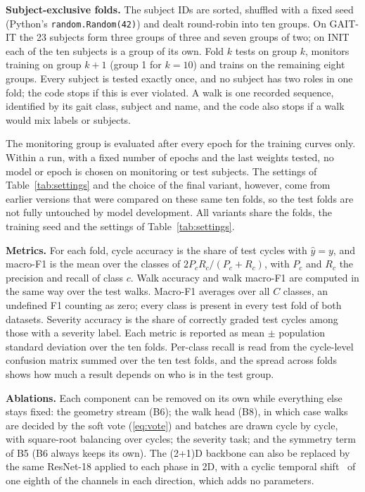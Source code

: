 \documentclass[conference]{IEEEtran}
\begin{document}
\textbf{Subject-exclusive folds.} The subject IDs are sorted, shuffled with a fixed seed (Python's \texttt{random.Random(42)}) and dealt round-robin into ten groups. On GAIT-IT the 23 subjects form three groups of three and seven groups of two; on INIT each of the ten subjects is a group of its own. Fold $k$ tests on group $k$, monitors training on group $k+1$ (group 1 for $k=10$) and trains on the remaining eight groups. Every subject is tested exactly once, and no subject has two roles in one fold; the code stops if this is ever violated. A walk is one recorded sequence, identified by its gait class, subject and name, and the code also stops if a walk would mix labels or subjects.

The monitoring group is evaluated after every epoch for the training curves only. Within a run, with a fixed number of epochs and the last weights tested, no model or epoch is chosen on monitoring or test subjects. The settings of Table~\ref{tab:settings} and the choice of the final variant, however, come from earlier versions that were compared on these same ten folds, so the test folds are not fully untouched by model development. All variants share the folds, the training seed and the settings of Table~\ref{tab:settings}.

\textbf{Metrics.} For each fold, cycle accuracy is the share of test cycles with $\hat{y}=y$, and macro-F1 is the mean over the classes of $2P_cR_c/(P_c+R_c)$, with $P_c$ and $R_c$ the precision and recall of class $c$. Walk accuracy and walk macro-F1 are computed in the same way over the test walks. Macro-F1 averages over all $C$ classes, an undefined F1 counting as zero; every class is present in every test fold of both datasets. Severity accuracy is the share of correctly graded test cycles among those with a severity label. Each metric is reported as mean $\pm$ population standard deviation over the ten folds. Per-class recall is read from the cycle-level confusion matrix summed over the ten test folds, and the spread across folds shows how much a result depends on who is in the test group.

\textbf{Ablations.} Each component can be removed on its own while everything else stays fixed: the geometry stream (B6); the walk head (B8), in which case walks are decided by the soft vote (\ref{eq:vote}) and batches are drawn cycle by cycle, with square-root balancing over cycles; the severity task; and the symmetry term of B5 (B6 always keeps its own). The (2+1)D backbone can also be replaced by the same ResNet-18 applied to each phase in 2D, with a cyclic temporal shift~\cite{tsm} of one eighth of the channels in each direction, which adds no parameters.
\end{document}
